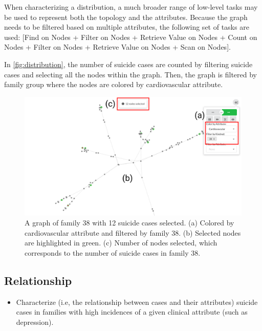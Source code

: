 \documentclass{vgtc}                          %
\begin{document}
When characterizing a distribution, a much broader range of low-level tasks may be used to represent both the topology and the attributes. Because the graph needs to be filtered based on multiple attributes, the following set of tasks are used: [Find on Nodes + Filter on Nodes + Retrieve Value on Nodes + Count on Nodes + Filter on Nodes + Retrieve Value on Nodes + Scan on Nodes].

In \autoref{fig:distribution}, the number of suicide cases are counted by filtering suicide cases and selecting all the nodes within the graph. Then, the graph is filtered by family group where the nodes are colored by cardiovascular attribute.

\begin{figure}[tb]
 \centering %
 \includegraphics[width=\columnwidth]{pictures/distribution.png}
 \caption{A graph of family 38 with 12 suicide cases selected. (a) Colored by cardiovascular attribute and filtered by family 38. (b) Selected nodes are highlighted in green. (c) Number of nodes selected, which corresponds to the number of suicide cases in family 38.}
 \label{fig:distribution}
\end{figure}

\subsection{Relationship}

\begin{itemize}
\item{Characterize (i.e, the relationship between cases and their attributes) suicide cases in families with high incidences of a given clinical attribute (such as depression).}
\end{itemize}
\end{document}
